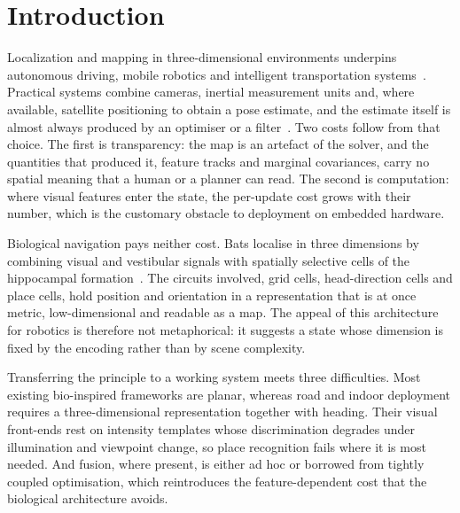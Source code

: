 \documentclass[review,12pt]{elsarticle}
\begin{document}
\section{Introduction}
\label{sec:intro}

Localization and mapping in three-dimensional environments underpins autonomous driving, mobile robotics and intelligent transportation systems~\cite{cadena2016past}. Practical systems combine cameras, inertial measurement units and, where available, satellite positioning to obtain a pose estimate, and the estimate itself is almost always produced by an optimiser or a filter~\cite{saputra2018visual}. Two costs follow from that choice. The first is transparency: the map is an artefact of the solver, and the quantities that produced it, feature tracks and marginal covariances, carry no spatial meaning that a human or a planner can read. The second is computation: where visual features enter the state, the per-update cost grows with their number, which is the customary obstacle to deployment on embedded hardware.

Biological navigation pays neither cost. Bats localise in three dimensions by combining visual and vestibular signals with spatially selective cells of the hippocampal formation~\cite{jeffery2013navigating,hafting2005microstructure,taube1990head,finkelstein2016three,solstad2008representation}. The circuits involved, grid cells, head-direction cells and place cells, hold position and orientation in a representation that is at once metric, low-dimensional and readable as a map. The appeal of this architecture for robotics is therefore not metaphorical: it suggests a state whose dimension is fixed by the encoding rather than by scene complexity.

Transferring the principle to a working system meets three difficulties. Most existing bio-inspired frameworks are planar, whereas road and indoor deployment requires a three-dimensional representation together with heading. Their visual front-ends rest on intensity templates whose discrimination degrades under illumination and viewpoint change, so place recognition fails where it is most needed. And fusion, where present, is either ad hoc or borrowed from tightly coupled optimisation, which reintroduces the feature-dependent cost that the biological architecture avoids.
\end{document}

